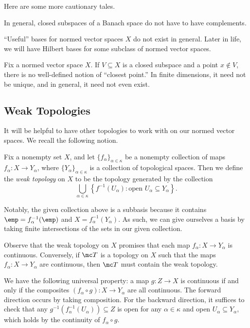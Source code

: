 \documentclass[../notes.tex]{subfiles}
\begin{document}
Here are some more cautionary tales.
\begin{remark}
	In general, closed subspaces of a Banach space do not have to have complements.
\end{remark}
\begin{remark}
	``Useful'' bases for normed vector spaces $X$ do not exist in general. Later in life, we will have Hilbert bases for some subclass of normed vector spaces.
\end{remark}
\begin{remark}
	Fix a normed vector space $X$. If $V\subseteq X$ is a closed subspace and a point $x\notin V$, there is no well-defined notion of ``closest point.'' In finite dimensions, it need not be unique, and in general, it need not even exist.
\end{remark}

\subsection{Weak Topologies}
It will be helpful to have other topologies to work with on our normed vector spaces. We recall the following notion.
\begin{definition}
	Fix a nonempty set $X$, and let $\{f_\alpha\}_{\alpha\in\kappa}$ be a nonempty collection of maps $f_\alpha\colon X\to Y_\alpha$, where $\{Y_\alpha\}_{\alpha\in\kappa}$ is a collection of topological spaces. Then we define the \textit{weak topology} on $X$ to be the topology generated by the collection
	\[\bigcup_{\alpha\in\kappa}\left\{f^{-1}(U_\alpha):\text{open }U_\alpha\subseteq Y_\alpha\right\}.\]
\end{definition}
\begin{remark}
	Notably, the given collection above is a subbasis because it contains $\emp=f_\alpha^{-1}(\emp)$ and $X=f_\alpha^{-1}(Y_\alpha)$. As such, we can give ourselves a basis by taking finite intersections of the sets in our given collection.
\end{remark}
\begin{remark}
	Observe that the weak topology on $X$ promises that each map $f_\alpha\colon X\to Y_\alpha$ is continuous. Conversely, if $\mc T$ is a topology on $X$ such that the maps $f_\alpha\colon X\to Y_\alpha$ are continuous, then $\mc T$ must contain the weak topology.
\end{remark}
\begin{remark}
	We have the following universal property: a map $g\colon Z\to X$ is continuous if and only if the composites $(f_\alpha\circ g)\colon X\to Y_\alpha$ are all continuous. The forward direction occurs by taking composition. For the backward direction, it suffices to check that any $g^{-1}\left(f_\alpha^{-1}(U_\alpha)\right)\subseteq Z$ is open for any $\alpha\in\kappa$ and open $U_\alpha\subseteq Y_\alpha$, which holds by the continuity of $f_\alpha\circ g$.
\end{remark}
\end{document}
